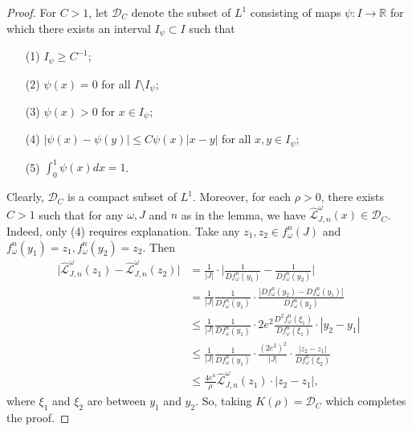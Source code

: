 \documentclass[11pt,oneside]{article}
\theoremstyle{plain}
\numberwithin{equation}{section}
\numberwithin{figure}{section}
\numberwithin{table}{section}
\begin{document}
\begin{proof}

For $C>1$, let $\mathscr D_C$ denote the subset of $L^1$ consisting of maps $\psi : I \to \mathbb R$ for which there exists an interval $I_{\psi} \subset I$ such that 

\begin{enumerate}
\item[(1)] $I_{\psi} \geq C^{-1}$;
\item[(2)] $\psi(x) = 0$ for all $I \setminus I_{\psi}$;
\item[(3)] $\psi(x) > 0$ for $x \in I_{\psi}$;
\item[(4)] $|\psi(x) - \psi(y)| \leq C\psi(x) |x-y|$ for all $x, y \in I_{\psi}$;
\item[(5)] $\int_0^1 \psi(x) dx =1$.
\end{enumerate}
Clearly, $\mathscr D_C$ is a compact subset of $L^1$. Moreover, for each $\rho>0$, there exists $C>1$ such that for any $\omega, J$ and $n$ as in the lemma, we have $\hat {\mathcal L}_{J, n}^{\omega}(x) \in \mathscr D_C$. Indeed, only (4) requires explanation. Take any $z_1, z_2 \in f_{\omega}^n (J)$ and $f_{\omega}^n (y_1) = z_1, f_{\omega}^n (y_2) = z_2$. Then
\begin{align*}
\big| \hat {\mathcal L}_{J, n}^{\omega}(z_1) - \hat {\mathcal L}_{J, n}^{\omega}(z_2) \big| & = \frac{1}{|J|} \cdot \bigg| \frac{1}{Df_{\omega}^n(y_1)} - \frac{1}{Df_{\omega}^n(y_2)} \bigg|  \\
& =  \frac{1}{|J|} \frac{1}{Df_{\omega}^n(y_1)}  \cdot \frac{|Df_{\omega}^n(y_2) - Df_{\omega}^n(y_1)|}{Df_{\omega}^n(y_2)} \\
& \leq \frac{1}{|J|} \frac{1}{Df_{\omega}^n(y_1)} \cdot 2e^2 \frac{D^2f_{\omega}^n(\xi_1)}{Df_{\omega}^n(\xi_1)} \cdot |y_2 - y_1| \\
& \leq  \frac{1}{|J|} \frac{1}{Df_{\omega}^n(y_1)} \cdot  \frac{(2e^2)^2}{|J|} \cdot \frac{|z_2 - z_1|}{Df_{\omega}^n (\xi_2)} \\
& \leq \frac{4e^4}{\rho} \hat {\mathcal L}_{J, n}^{\omega}(z_1)\cdot |z_2 - z_1|,
\end{align*} 
where $\xi_1$ and $\xi_2$ are between $y_1$ and $y_2$. So, taking $K(\rho) = \mathscr D_C$ which completes the proof.

\end{proof}
\end{document}
